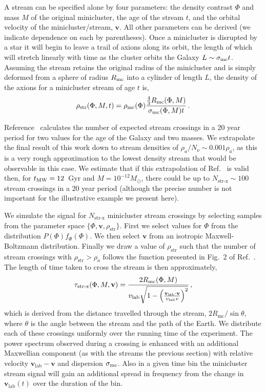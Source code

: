 A stream can be specified alone by four parameters: the density contrast $\Phi$ and mass $M$ of the original minicluster, the age of the stream $t$, and the orbital velocity of the minicluster/stream, $\textbf{v}$. All other parameters can be derived (we indicate dependence on each by parentheses). Once a minicluster is disrupted by a star it will begin to leave a trail of axions along its orbit, the length of which will stretch linearly with time as the cluster orbits the Galaxy $L \sim \sigma_{\rm mc} t$. Assuming the stream retains the original radius of the minicluster and is simply deformed from a sphere of radius $R_{\rm mc}$ into a cylinder of length $L$, the density of the axions for a minicluster stream of age $t$ is, 
\begin{equation}\label{eq:mcstreamdensity}
\rho_{\rm str}(\Phi,M,t) = \rho_{\rm mc}(\Phi) \frac{\frac{4}{3}R_{\rm mc}(\Phi,M)}{\sigma_{\rm mc}(\Phi,M) t} \, .
\end{equation}

Reference~\cite{Tinyakov:2015cgg} calculates the number of expected stream crossings in a 20 year period for two values for the age of the Galaxy and two masses. We extrapolate the final result of this work down to stream densities of $\rho_a/N_\nu \sim 0.001 \rho_a$, as this is a very rough approximation to the lowest density stream that would be observable in this case. We estimate that if this extrapolation of Ref.~\cite{Tinyakov:2015cgg} is valid then, for $t_{\rm MW} = 12$~Gyr and $M = 10^{-12} M_\odot$, there could be up to $N_{\textrm{str-x}} \sim 100$ stream crossings in a 20 year period (although the precise number is not important for the illustrative example we present here). 

We simulate the signal for $N_\textrm{str-x}$ minicluster stream crossings by selecting samples from the parameter space $\{\Phi, \textbf{v}, \rho_\textrm{str}\}$. First we select values for $\Phi$ from the distribution $P(\Phi)f_\Phi(\Phi)$. We then select $\textbf{v}$ from an isotropic Maxwell-Boltzmann distribution. Finally we draw a value of $\rho_\textrm{str}$ such that the number of stream crossings with $\rho_\textrm{str}>\rho_a$ follows the function presented in Fig.~2 of Ref.~\cite{Tinyakov:2015cgg}. The length of time taken to cross the stream is then approximately,
\begin{equation}\label{eq:streamcrossingtime}
\tau_\textrm{str-x}(\Phi,M,\textbf{v}) = \frac{2 R_{\rm mc}(\Phi,M)}{v_\textrm{lab}\sqrt{1-\left(\frac{\textbf{v}_\textrm{lab}\cdot\textbf{v}}{v_\textrm{lab}v}\right)^2}} \, ,
\end{equation}
which is derived from the distance travelled through the stream, $2R_\textrm{mc}/\sin\theta$, where $\theta$ is the angle between the stream and the path of the Earth. We distribute each of these crossings uniformly over the running time of the experiment. The power spectrum observed during a crossing is enhanced with an additional Maxwellian component (as with the streams the previous section) with relative velocity $\textbf{v}_\textrm{lab} - \textbf{v}$ and dispersion $\sigma_{\rm mc}$. Also in a given time bin the minicluster stream signal will gain an additional spread in frequency from the change in $\textbf{v}_\textrm{lab}(t)$ over the duration of the bin.

